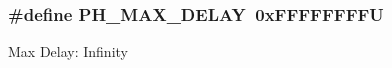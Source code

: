 \subsubsection[{\texorpdfstring{P\+H\+\_\+\+M\+A\+X\+\_\+\+D\+E\+L\+AY}{PH_MAX_DELAY}}]{\setlength{\rightskip}{0pt plus 5cm}\#define P\+H\+\_\+\+M\+A\+X\+\_\+\+D\+E\+L\+AY~0x\+F\+F\+F\+F\+F\+F\+F\+FU}\hypertarget{group___p_h___timeout_ga9e7ffefefdb88b7d702add13d4248ee4}{}\label{group___p_h___timeout_ga9e7ffefefdb88b7d702add13d4248ee4}
Max Delay\+: Infinity 